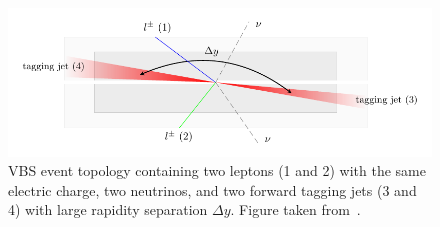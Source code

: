 \begin{figure}[htbp]
  \centering
  \includegraphics[width=.95\textwidth]{figs/ssww_13tev/introduction/vbs_event_topology}
  \caption[\ssww VBS event topology containing two leptons (1 and 2) with the same electric charge, two neutrinos, and two forward tagging jets (3 and 4) with large rapidity separation $\Delta y$.]{\ssww VBS event topology containing two leptons (1 and 2) with the same electric charge, two neutrinos, and two forward tagging jets (3 and 4) with large rapidity separation $\Delta y$.  Figure taken from~\cite{2013.ssww-8tev-atlas-support}.}
  \label{fig:ssww13tev_event_topology}
\end{figure}

